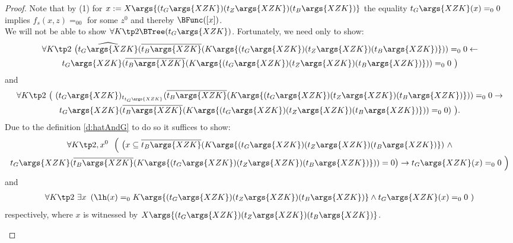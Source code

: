 \begin{proof}
Note that by (1) for $x:=X \args{
                                          (t_G\args{XZK})
                                          (t_Z\args{XZK})
                                          (t_B\args{XZK})
                                        }$
the equality $t_G\args{XZK}(x)=_00$ implies $f_s(x,z)=_00$ for some $z^0$ and thereby
 $\BFunc([x])$.\\
We will not be able to show $\forall K\tp2\BTree(t_G\args{XZK})$. Fortunately, we need only
to show:
\begin{multline*}
\forall K\tp2\ {\big(} 
\widehat{t_G\args{XZK}}
 (\overline{t_B\args{XZK}}(K\args{ (t_G\args{XZK}) (t_Z\args{XZK}) (t_B\args{XZK}) }))=_00 
       \leftarrow\\
 t_G\args{XZK}
   (\overline{t_B\args{XZK}}(K\args{ (t_G\args{XZK}) (t_Z\args{XZK}) (t_B\args{XZK}) }))=_00\ 
{\big)} 
\end{multline*}
and
\begin{multline*}
\forall K\tp2\ {\big(}\ (t_G\args{XZK})_{t_{t_G\args{XZK}}}(\overline{t_B\args{XZK}}(K\args{ (t_G\args{XZK}) (t_Z\args{XZK}) (t_B\args{XZK}) }))=_00 \rightarrow\\
                           t_G\args{XZK}(\overline{t_B\args{XZK}}(K\args{ (t_G\args{XZK}) (t_Z\args{XZK}) (t_B\args{XZK}) }))=_00)\ {\big)}\text{.}
\end{multline*}
Due to the definition \ref{d:hatAndG} to do so it suffices to show:
\begin{multline}
\forall K\tp2,x^0 
\ \ {\Big(\ }{\big(} x\subseteq 
       \overline{t_B\args{XZK}}(K\args{ (t_G\args{XZK}) (t_Z\args{XZK}) (t_B\args{XZK}) } ) 
      \ \wedge \\
      t_G\args{XZK}
       (\overline{t_B\args{XZK}}(K\args{ (t_G\args{XZK}) (t_Z\args{XZK}) (t_B\args{XZK}) } ))=0
    {\big)}
    \rightarrow 
                           t_G\args{XZK}(x)=_00 {\ \Big)} \label{e:tree}
\end{multline}
and
\begin{align}
\forall K\tp2\ \exists x\ \left(
    \lh(x)=_0 K\args{ (t_G\args{XZK}) (t_Z\args{XZK}) (t_B\args{XZK}) }
    \wedge t_G\args{XZK}(x)=_00\ \right) \label{e:inf}
\end{align}
respectively, where $x$ is witnessed by $X\args{(t_G\args{XZK})(t_Z\args{XZK})(t_B\args{XZK})}$.
\begin{itemize}

\end{itemize}
\end{proof}
